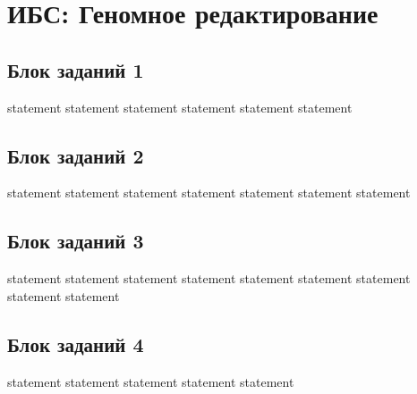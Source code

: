 \chapter{ИБС: Геномное редактирование}

\section{Блок заданий 1}

{statement}
{statement}
{statement}
{statement}
{statement}
{statement}

\section{Блок заданий 2}

{statement}
{statement}
{statement}
{statement}
{statement}
{statement}
{statement}

\section{Блок заданий 3}

{statement}
{statement}
{statement}
{statement}
{statement}
{statement}
{statement}
{statement}
{statement}

\section{Блок заданий 4}

{statement}
{statement}
{statement}
{statement}
{statement}